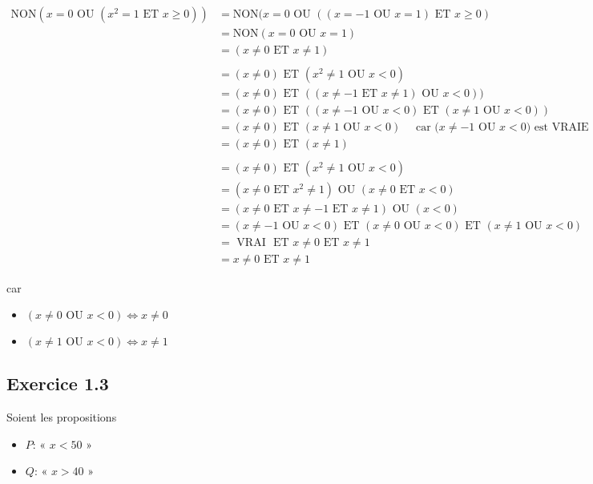 \documentclass[a4paper,10pt]{report}
\begin{document}
\begin{equation*}
	\begin{split}
		\text{NON}(x=0 \text{ OU } (x^2 =1 \text{ ET } x\geq 0)) 
		&= \text{NON}(x=0 \text{ OU } ((x=-1\text{ OU } x=1)\text{ ET } x\geq0)\\
		&= \text{NON}(x=0 \text{ OU } x=1)\\
		&= (x\neq 0 \text{ ET } x\neq 1)\\
		\\
		&= (x \neq 0) \text{ ET } (x^2\neq 1 \text{ OU } x<0) \\
		&= (x \neq 0) \text{ ET } ((x \neq -1 \text{ ET } x \neq 1) \text{ OU } x<0))\\
		&= (x \neq 0) \text{ ET } ((x \neq -1 \text{ OU } x <0) \text{ ET }(x \neq 1 \text{ OU } x<0))\\
		&= (x \neq 0) \text{ ET } (x \neq 1 \text{ OU } x<0) \quad\text{ car ($x \neq -1 \text{ OU } x <0)$ est VRAIE}\\
		&= (x \neq 0) \text{ ET } (x \neq 1) \\
		\\
		&= (x \neq 0) \text{ ET } (x^2\neq 1 \text{ OU } x<0) \\
		&= (x\neq 0 \text{ ET } x^2 \neq 1) \text{ OU } (x \neq 0 \text{ ET } x< 0) \\
		&= (x\neq 0 \text{ ET } x \neq -1 \text{ ET } x \neq 1) \text{ OU } (x< 0) \\
		&= (x \neq -1 \text{ OU } x< 0) \text{ ET } (x \neq 0 \text{ OU } x< 0) \text{ ET } (x \neq 1 \text{ OU } x< 0) \\
		&= \text{ VRAI } \text{ ET } x \neq 0 \text{ ET } x \neq 1 \\
		&= x \neq 0 \text{ ET } x \neq 1
	\end{split}
\end{equation*}

car 
\begin{itemize}
	\item $(x \neq 0 \text{ OU } x< 0) \Longleftrightarrow x \neq 0$ \\
	\item $(x \neq 1 \text{ OU } x< 0) \Longleftrightarrow x \neq 1$
\end{itemize}


\subsection*{Exercice 1.3}
Soient les propositions
\begin{itemize}
	\item $P$: « $x<50$ » \\
	\item $Q$: « $x>40$ » \\
\end{itemize}
\end{document}

